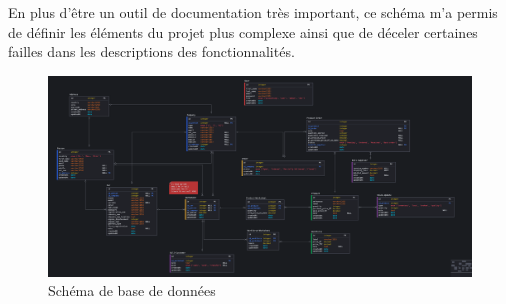 En plus d'être un outil de documentation très important, ce schéma m'a permis de définir les éléments du projet plus complexe ainsi que de déceler certaines failles dans les descriptions des fonctionnalités. 

\begin{figure}
  \centering
  \includegraphics[width=\textwidth]{img/DB-schema.png}
  \caption{Schéma de base de données}
\end{figure}